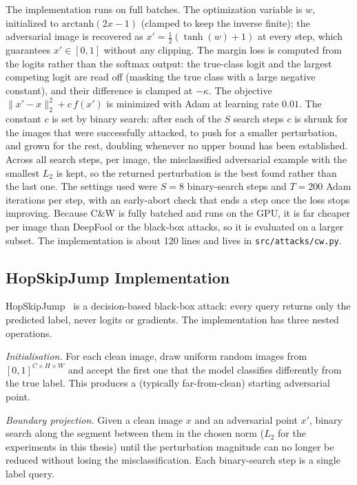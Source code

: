 The implementation runs on full batches. The optimization variable is $w$, initialized to $\text{arctanh}(2x - 1)$ (clamped to keep the inverse finite); the adversarial image is recovered as $x' = \tfrac{1}{2}(\tanh(w) + 1)$ at every step, which guarantees $x' \in [0, 1]$ without any clipping. The margin loss is computed from the logits rather than the softmax output: the true-class logit and the largest competing logit are read off (masking the true class with a large negative constant), and their difference is clamped at $-\kappa$. The objective $\|x' - x\|_2^2 + c\,f(x')$ is minimized with Adam at learning rate $0.01$. The constant $c$ is set by binary search: after each of the $S$ search steps $c$ is shrunk for the images that were successfully attacked, to push for a smaller perturbation, and grown for the rest, doubling whenever no upper bound has been established. Across all search steps, per image, the misclassified adversarial example with the smallest $L_2$ is kept, so the returned perturbation is the best found rather than the last one. The settings used were $S = 8$ binary-search steps and $T = 200$ Adam iterations per step, with an early-abort check that ends a step once the loss stops improving. Because C\&W is fully batched and runs on the GPU, it is far cheaper per image than DeepFool or the black-box attacks, so it is evaluated on a larger subset. The implementation is about 120 lines and lives in \texttt{src/attacks/cw.py}.

\subsection{HopSkipJump Implementation}

HopSkipJump~\cite{chen2020hopskipjump} is a decision-based black-box attack: every query returns only the predicted label, never logits or gradients. The implementation has three nested operations.

\textit{Initialisation.} For each clean image, draw uniform random images from $[0, 1]^{C \times H \times W}$ and accept the first one that the model classifies differently from the true label. This produces a (typically far-from-clean) starting adversarial point.

\textit{Boundary projection.} Given a clean image $x$ and an adversarial point $x'$, binary search along the segment between them in the chosen norm ($L_2$ for the experiments in this thesis) until the perturbation magnitude can no longer be reduced without losing the misclassification. Each binary-search step is a single label query.

